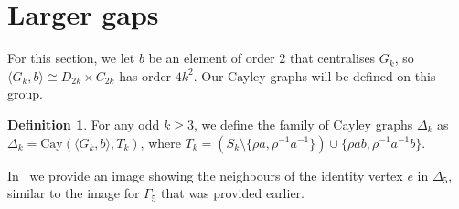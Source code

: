 \documentclass{amsart}
\theoremstyle{remark}
\theoremstyle{definition}
\newtheorem{defn}[thm]{Definition}
\newcommand{\Cay}[2]{\mathrm{Cay}(#1,#2)}		%
\begin{document}
\section{Larger gaps}

For this section, we let $b$ be an element of order $2$ that centralises $G_k$, so $\langle G_k,b \rangle \cong D_{2k} \times C_{2k}$ has order $4k^2$. Our Cayley graphs will be defined on this group.

\begin{defn}
    For any odd $k\ge 3$, we define the family of Cayley graphs $\Delta_k$ as $\Delta_k=\Cay{\langle G_k,b \rangle}{T_k}$, where $T_k=(S_k\setminus\{\rho a,\rho^{-1}a^{-1}\}) \cup \{\rho ab,\rho^{-1}a^{-1}b\}$.
\end{defn}

In~ we provide an image showing the neighbours of the identity vertex $e$ in $\Delta_5$, similar to the image for $\Gamma_5$ that was provided earlier.
\end{document}
